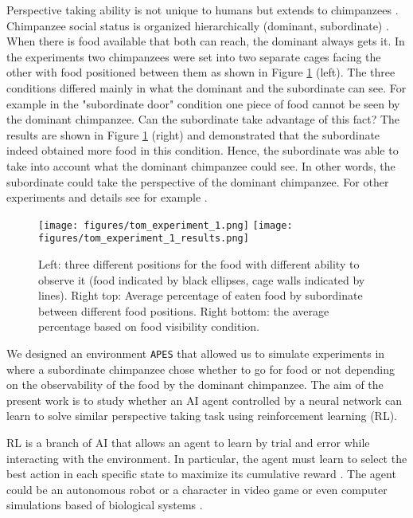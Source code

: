 \documentclass{article}
\begin{document}
\par Perspective taking ability is not unique to humans but extends to chimpanzees \cite{hare2000chimpanzees}. Chimpanzee social status is organized hierarchically (dominant, subordinate) \cite{goldberg1997genetic}. When there is food available that both can reach, the dominant always gets it. In the experiments \cite{hare2000chimpanzees}  two chimpanzees were set into two separate cages facing the other with food positioned between them as shown in Figure \ref{tom.experiment} (left). The three conditions differed mainly in what the dominant and the subordinate can see. For example in the "subordinate door" condition one piece of food cannot be seen by the dominant chimpanzee. Can the subordinate take advantage of this fact? The results are shown in Figure \ref{tom.experiment} (right) and demonstrated that the subordinate indeed obtained more food in this condition. Hence, the subordinate was able to take into account what the dominant chimpanzee could see. In other words, the subordinate could take the perspective of the dominant chimpanzee. For other experiments and details see for example \cite{hare2000chimpanzees, de2016we, tomasello2009cultural}.  

\begin{figure}[!ht]
\begin{center}
\texttt{[image: figures/tom\_experiment\_1.png]}
\texttt{[image: figures/tom\_experiment\_1\_results.png]}
\caption{Left: three different positions for the food with different ability to observe it (food indicated by black ellipses, cage walls indicated by lines). Right top: Average percentage of eaten food by subordinate between different food positions. Right bottom: the average percentage based on food visibility condition. \cite{hare2000chimpanzees}}
\label{tom.experiment}
\end{center}
\end{figure}

We designed an environment \texttt{APES} that allowed us to simulate experiments in \cite{hare2000chimpanzees} where a subordinate chimpanzee chose whether to go for food or not depending on the observability of the food by the dominant chimpanzee. The aim of the present work is to study whether an AI agent controlled by a neural network can learn to solve similar perspective taking task using reinforcement learning (RL).

RL is a branch of AI that allows an agent to learn by trial and error while interacting with the environment. In particular, the agent must learn to select the best action in each specific state to maximize its cumulative reward \cite{sutton1998reinforcement}. The agent could be an autonomous robot \cite{lin1993reinforcement,yang2004multiagent,riedmiller2009reinforcement} or a character in video game \cite{mnih2013playing,tampuu2017multiagent} or even computer simulations based of biological systems \cite{amigoni2007multiagent}. 
\end{document}
